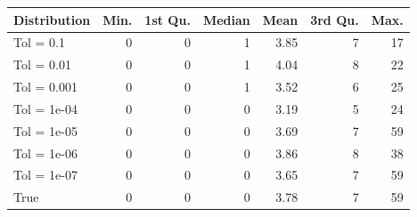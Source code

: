 \begin{figure} 
\begin{tabular}{lrrrrrr}
 Distribution & Min. & 1st Qu. & Median & Mean & 3rd Qu. & Max. \\ 
  \hline
\hline
Tol =  0.1 & 0 & 0 & 1 & 3.85 & 7 & 17 \\ 
  Tol =  0.01 & 0 & 0 & 1 & 4.04 & 8 & 22 \\ 
  Tol =  0.001 & 0 & 0 & 1 & 3.52 & 6 & 25 \\ 
  Tol =  1e-04 & 0 & 0 & 0 & 3.19 & 5 & 24 \\ 
  Tol =  1e-05 & 0 & 0 & 0 & 3.69 & 7 & 59 \\ 
  Tol =  1e-06 & 0 & 0 & 0 & 3.86 & 8 & 38 \\ 
  Tol =  1e-07 & 0 & 0 & 0 & 3.65 & 7 & 59 \\ 
  True & 0 & 0 & 0 & 3.78 & 7 & 59 \\ 
  \end{tabular}
\label{tab:SummaryTable}
\end{figure} 
